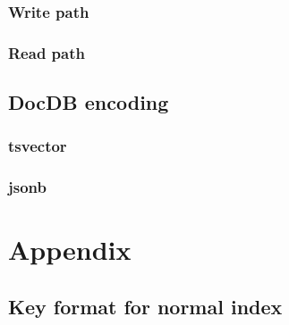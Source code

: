 \documentclass[11pt]{article}
\begin{document}
\hypertarget{write-path}{%
\subsubsection{Write path}\label{write-path}}


\hypertarget{read-path}{%
\subsubsection{Read path}\label{read-path}}


\hypertarget{docdb-encoding}{%
\subsection{DocDB encoding}\label{docdb-encoding}}


\hypertarget{tsvector}{%
\subsubsection{tsvector}\label{tsvector}}


\hypertarget{jsonb}{%
\subsubsection{jsonb}\label{jsonb}}


\hypertarget{appendix}{%
\section{Appendix}\label{appendix}}

\hypertarget{key-format-for-normal-index}{%
\subsection{Key format for normal
index}\label{key-format-for-normal-index}}

\end{document}
